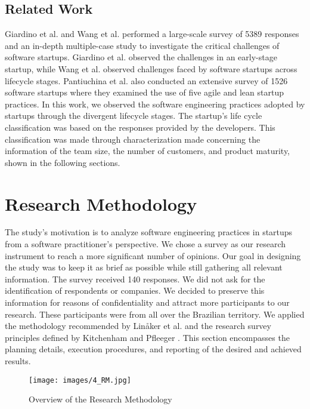 \documentclass[runningheads]{llncs}
\begin{document}
\subsection{Related Work}

Giardino et al. \cite{Giardino2015} and Wang et al. \cite{wang2016key} performed a large-scale survey of 5389 responses and an in-depth multiple-case study to investigate the critical challenges of software startups. Giardino et al. \cite{Giardino2015} observed the challenges in an early-stage startup, while Wang et al. \cite{wang2016key} observed challenges faced by software startups across lifecycle stages. Pantiuchina et al. \cite{Pantiuchina2017} also conducted an extensive survey of 1526 software startups where they examined the use of five agile and lean startup practices. In this work, we observed the software engineering practices adopted by startups through the divergent lifecycle stages. The startup's life cycle classification was based on the responses provided by the developers. This classification was made through characterization made concerning the information of the team size, the number of customers, and product maturity, shown in the following sections.

\section{Research Methodology} 
\label{section:methodology}

The study's motivation is to analyze software engineering practices in startups from a software practitioner's perspective. We chose a survey as our research instrument to reach a more significant number of opinions. Our goal in designing the study was to keep it as brief as possible while still gathering all relevant information. The survey received 140 responses. We did not ask for the identification of respondents or companies. We decided to preserve this information for reasons of confidentiality and attract more participants to our research. These participants were from all over the Brazilian territory. We applied the methodology recommended by Lin{\aa}ker et al. \cite{Linaaker2015} and the research survey principles defined by Kitchenham and Pfleeger \cite{Pfleeger2001}. This section encompasses the planning details, execution procedures, and reporting of the desired and achieved results.

\begin{figure*}[!ht]
\centering
\texttt{[image: images/4\_RM.jpg]}
\caption{Overview of the Research Methodology}
\label{figure:methodology}
\end{figure*}
\end{document}
